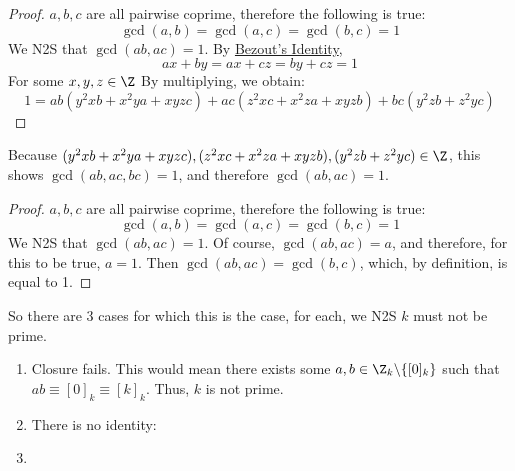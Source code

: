 \begin{proof}$a,b,c$ are all pairwise coprime, therefore the following is true:\begin{equation}\label{eqa}\gcd(a,b)=\gcd(a,c)=\gcd(b,c)=1\end{equation} We N2S that $\gcd(ab,ac)=1$. \newline By \href{https://en.wikipedia.org/wiki/B%C3%A9zout%27s_identity}{\color{cyan}Bezout's Identity}, \begin{equation}\label{eqb}ax+by=ax+cz=by+cz=1\end{equation} For some $x,y,z\in\Z$ By multiplying, we obtain:\begin{equation}1=ab(y^2xb+x^2ya+xyzc)+ac(z^2xc+x^2za+xyzb)+bc(y^2zb+z^2yc)\end{equation}
    \end{proof}Because $(y^2xb+x^2ya+xyzc),(z^2xc+x^2za+xyzb),(y^2zb+z^2yc)\in\Z$, this shows $\gcd(ab,ac,bc)=1$, and therefore $\gcd(ab,ac)=1$.
\begin{proof}$a,b,c$ are all pairwise coprime, therefore the following is true:\begin{equation}\label{eqa}\gcd(a,b)=\gcd(a,c)=\gcd(b,c)=1\end{equation} We N2S that $\gcd(ab,ac)=1$. Of course, $\gcd(ab,ac)=a$, and therefore, for this to be true, $a=1$. Then $\gcd(ab,ac)=\gcd(b,c)$, which, by definition, is equal to 1. \end{proof}
        So there are 3 cases for which this is the case, for each, we N2S $k$ must not be prime.\begin{enumerate}[label=(\roman*)]
            \item Closure fails. This would mean there exists some $a,b\in\Z_k\backslash \{[0]_k\}$ such that $ab\equiv[0]_k\equiv[k]_k$. Thus, $k$ is not prime.
            \item There is no identity:
            \item 
        \end{enumerate}